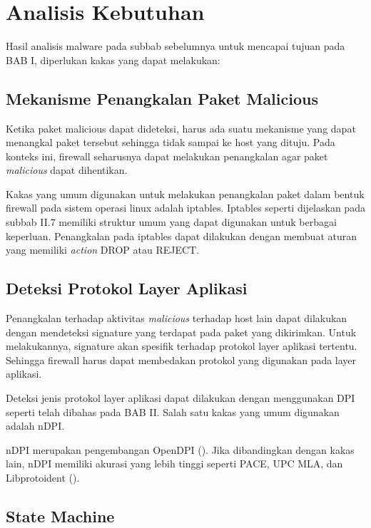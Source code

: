 \section{Analisis Kebutuhan}

Hasil analisis malware pada subbab sebelumnya untuk mencapai tujuan pada BAB I, diperlukan kakas yang dapat melakukan:

\subsection{Mekanisme Penangkalan Paket Malicious}

Ketika paket malicious dapat dideteksi, harus ada suatu mekanisme yang dapat menangkal paket tersebut sehingga tidak sampai ke host yang dituju. Pada konteks ini, firewall seharusnya dapat melakukan penangkalan agar paket \textit{malicious} dapat dihentikan.

Kakas yang umum digunakan untuk melakukan penangkalan paket dalam bentuk firewall pada sistem operasi linux adalah iptables. Iptables seperti dijelaskan pada subbab II.7 memiliki struktur umum yang dapat digunakan untuk berbagai keperluan. Penangkalan pada iptables dapat dilakukan dengan membuat aturan yang memiliki \textit{action} DROP atau REJECT.

\subsection{Deteksi Protokol Layer Aplikasi}

Penangkalan terhadap aktivitas \textit{malicious} terhadap host lain dapat dilakukan dengan mendeteksi signature yang terdapat pada paket yang dikirimkan. Untuk melakukannya, signature akan spesifik terhadap protokol layer aplikasi tertentu. Sehingga firewall harus dapat membedakan protokol yang digunakan pada layer aplikasi.

Deteksi jenis protokol layer aplikasi dapat dilakukan dengan menggunakan DPI seperti telah dibahas pada BAB II. Salah satu kakas yang umum digunakan adalah nDPI.

nDPI merupakan pengembangan OpenDPI (\cite{deri2014ndpi}). Jika dibandingkan dengan kakas lain, nDPI memiliki akurasi yang lebih tinggi seperti PACE, UPC MLA, dan Libprotoident (\cite{bujlow2013comparison}).

\subsection{State Machine}

